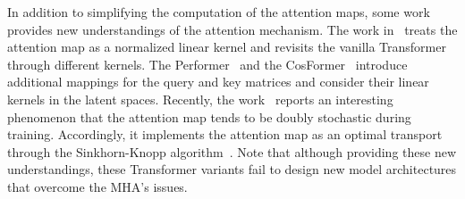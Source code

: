 In addition to simplifying the computation of the attention maps, some work provides new understandings of the attention mechanism. 
The work in~\cite{tsai2019transformer} treats the attention map as a normalized linear kernel and revisits the vanilla Transformer through different kernels.
The Performer~\cite{choromanski2021rethinking} and the CosFormer~\cite{zhen2022cosformer} introduce additional mappings for the query and key matrices and consider their linear kernels in the latent spaces.
Recently, the work~\cite{sander2022sinkformers} reports an interesting phenomenon that the attention map tends to be doubly stochastic during training. 
Accordingly, it implements the attention map as an optimal transport through the Sinkhorn-Knopp algorithm~\cite{sinkhorn1967concerning}. 
Note that although providing these new understandings, these Transformer variants fail to design new model architectures that overcome the MHA's issues.